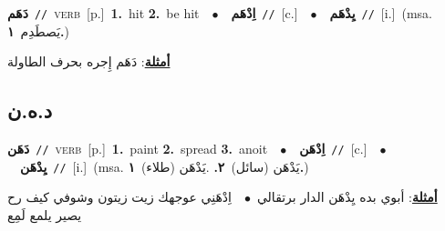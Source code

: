 \documentclass[10pt,a4paper,twoside]{article} %
\begin{document}
\begin{multicols}{2}
{\setlength\topsep{0pt}\textbf{\foreignlanguage{arabic}{دَهَم}}\ {\color{gray}\texttt{//}\color{black}}\ \textsc{verb}\ [p.]\ \textbf{1.}~hit  \textbf{2.}~be hit\ \ $\bullet$\ \ \setlength\topsep{0pt}\textbf{\foreignlanguage{arabic}{اِدْهَم}}\ {\color{gray}\texttt{//}\color{black}}\ [c.]\ \ $\bullet$\ \ \setlength\topsep{0pt}\textbf{\foreignlanguage{arabic}{يِدْهَم}}\ {\color{gray}\texttt{//}\color{black}}\ [i.]\ \color{gray}(msa. \foreignlanguage{arabic}{يَصطَدِم}~\foreignlanguage{arabic}{\textbf{١.}})\color{black}\  \begin{flushright}\color{gray}\foreignlanguage{arabic}{\textbf{\underline{\foreignlanguage{arabic}{أمثلة}}}: دَهَم إِجره بحرف الطاولة}\end{flushright}\color{black}} \vspace{2mm}

\vspace{-3mm}
\subsection*{\color{blue}\foreignlanguage{arabic}{د.ه.ن}\color{blue}{}} 

{\setlength\topsep{0pt}\textbf{\foreignlanguage{arabic}{دَهَن}}\ {\color{gray}\texttt{//}\color{black}}\ \textsc{verb}\ [p.]\ \textbf{1.}~paint  \textbf{2.}~spread  \textbf{3.}~anoit\ \ $\bullet$\ \ \setlength\topsep{0pt}\textbf{\foreignlanguage{arabic}{اِدْهَن}}\ {\color{gray}\texttt{//}\color{black}}\ [c.]\ \ $\bullet$\ \ \setlength\topsep{0pt}\textbf{\foreignlanguage{arabic}{يِدْهَن}}\ {\color{gray}\texttt{//}\color{black}}\ [i.]\ \color{gray}(msa. \foreignlanguage{arabic}{يَدْهَن (سائل)}~\foreignlanguage{arabic}{\textbf{٢.}}  .\foreignlanguage{arabic}{يَدْهَن (طلاء)}~\foreignlanguage{arabic}{\textbf{١.}})\color{black}\  \begin{flushright}\color{gray}\foreignlanguage{arabic}{\textbf{\underline{\foreignlanguage{arabic}{أمثلة}}}: أبوي بده يِدْهَن الدار برتقالي\ $\bullet$\ \  اِدْهَنِي عوجهك زيت زيتون وشوفي كيف رح يصير يلمع لَمِع}\end{flushright}\color{black}} \vspace{2mm}


\end{multicols}
\end{document}
